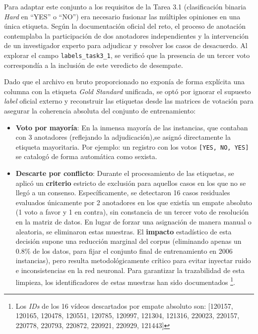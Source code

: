 Para adaptar este conjunto a los requisitos de la Tarea 3.1 (clasificación binaria \textit{Hard} en ``YES'' o ``NO'') era necesario fusionar las múltiples opiniones en una única etiqueta. Según la documentación oficial del reto, el proceso de anotación contemplaba la participación de dos anotadores independientes y la intervención de un investigador experto para adjudicar y resolver los casos de desacuerdo. Al explorar el campo \texttt{labels\_task3\_1}, se verificó que la presencia de un tercer voto correspondía a la inclusión de este veredicto de desempate. 

Dado que el archivo en bruto proporcionado no exponía de forma explícita una columna con la etiqueta \textit{Gold Standard} unificada, se optó por ignorar el supuesto \textit{label} oficial externo y reconstruir las etiquetas desde las matrices de votación para asegurar la coherencia absoluta del conjunto de entrenamiento:
\begin{itemize}
    \item \textbf{Voto por mayoría}: En la inmensa mayoría de las instancias, que contaban con 3 anotadores (reflejando la adjudicación),se asignó directamente la etiqueta mayoritaria. Por ejemplo: un registro con los votos \texttt{[YES, NO, YES]} se catalogó de forma automática como sexista.
    \item \textbf{Descarte por conflicto}: Durante el procesamiento de las etiquetas, se aplicó un \textbf{criterio} estricto de exclusión para aquellos casos en los que no se llegó a un consenso. Específicamente, se detectaron 16 casos residuales evaluados únicamente por 2 anotadores en los que existía un empate absoluto (1 voto a favor y 1 en contra), sin constancia de un tercer voto de resolución en la matriz de datos. En lugar de forzar una asignación de manera manual o aleatoria, se eliminaron estas muestras. El \textbf{impacto} estadístico de esta decisión supone una reducción marginal del corpus (eliminando apenas un 0.8\% de los datos, para fijar el conjunto final de entrenamiento en 2006 instancias), pero resulta metodológicamente crítico para evitar inyectar ruido e inconsistencias en la red neuronal. Para garantizar la trazabilidad de esta limpieza, los identificadores de estas muestras han sido documentados \footnote{Los \textit{IDs} de los 16 vídeos descartados por empate absoluto son: [120157, 120165, 120478, 120551, 120785, 120997, 121304, 121316, 220023, 220157, 220778, 220793, 220872, 220921, 220929, 121443]}.

\end{itemize}

